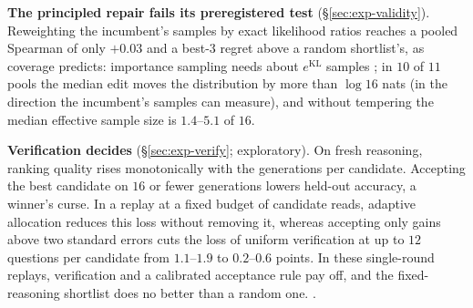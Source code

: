\textbf{The principled repair fails its preregistered test} (\S\ref{sec:exp-validity}). Reweighting
the incumbent's samples by exact likelihood ratios reaches a pooled Spearman of only $+0.03$ and a
best-3 regret above a random shortlist's, as coverage predicts: importance sampling needs about
$e^{\mathrm{KL}}$ samples \citep{chatterjee2018sample}; in $10$ of $11$ pools the median edit
moves the distribution by more than $\log 16$ nats (in the direction the incumbent's samples can
measure), and without tempering the median effective sample size is $1.4$--$5.1$ of $16$.

\textbf{Verification decides} (\S\ref{sec:exp-verify}; exploratory). On fresh reasoning, ranking
quality rises monotonically with the generations per candidate. Accepting the best candidate on
$16$ or fewer generations lowers held-out accuracy, a winner's curse. In a replay at a fixed budget
of candidate reads, adaptive allocation reduces this loss without removing it, whereas accepting only
gains above two standard errors cuts the loss of uniform verification at up to $12$ questions per
candidate from $1.1$--$1.9$ to $0.2$--$0.6$ points. In these single-round replays, verification and
a calibrated acceptance rule pay off, and the fixed-reasoning shortlist does no better than a random
one. .
